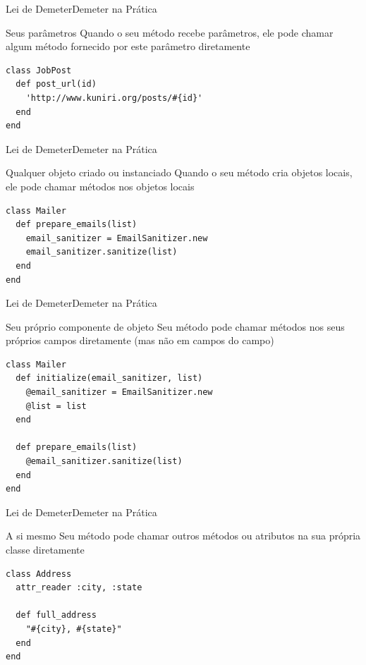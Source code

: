 \documentclass[10pt]{beamer}
\begin{document}
\begin{frame}[fragile]{Lei de Demeter}{Demeter na Prática}
  \begin{block}{Seus parâmetros}
    Quando o seu método recebe parâmetros, ele pode chamar algum
    método fornecido por este parâmetro diretamente
  \end{block}

  \pause

\begin{lstlisting}
class JobPost
  def post_url(id)
    'http://www.kuniri.org/posts/#{id}'
  end
end
\end{lstlisting}

\end{frame}

\begin{frame}[fragile]{Lei de Demeter}{Demeter na Prática}
  \begin{block}{Qualquer objeto criado ou instanciado}
    Quando o seu método cria objetos locais, ele pode chamar
    métodos nos objetos locais
  \end{block}

  \pause

\begin{lstlisting}
class Mailer
  def prepare_emails(list)
    email_sanitizer = EmailSanitizer.new
    email_sanitizer.sanitize(list)
  end
end
\end{lstlisting}

\end{frame}

\begin{frame}[fragile]{Lei de Demeter}{Demeter na Prática}
  \begin{block}{Seu próprio componente de objeto}
    Seu método pode chamar métodos nos seus próprios campos diretamente 
    (mas não em campos do campo)
  \end{block}

  \pause

\begin{lstlisting}
class Mailer
  def initialize(email_sanitizer, list)
    @email_sanitizer = EmailSanitizer.new
    @list = list
  end

  def prepare_emails(list)
    @email_sanitizer.sanitize(list)
  end
end
\end{lstlisting}

\end{frame}

\begin{frame}[fragile]{Lei de Demeter}{Demeter na Prática}
  \begin{block}{A si mesmo}
    Seu método pode chamar outros métodos ou atributos na sua própria classe
    diretamente
  \end{block}

  \pause

\begin{lstlisting}
class Address
  attr_reader :city, :state
  
  def full_address
    "#{city}, #{state}"
  end
end
\end{lstlisting}

\end{frame}
\end{document}
